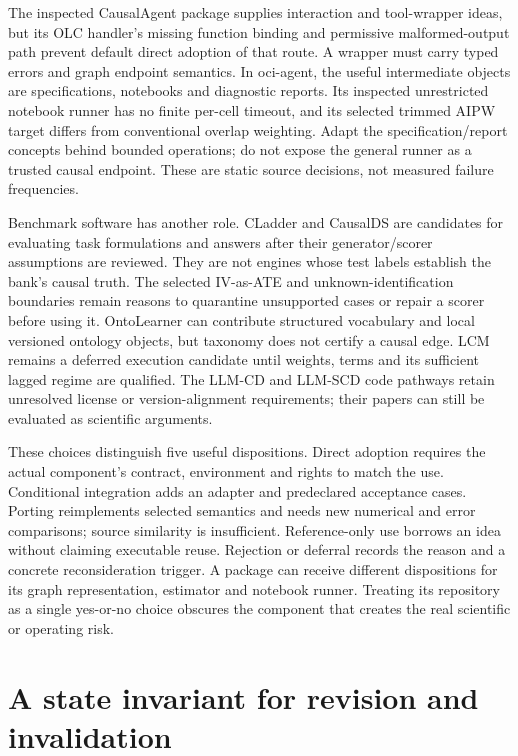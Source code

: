 The inspected CausalAgent package supplies interaction and tool-wrapper
ideas, but its OLC handler's missing function binding and permissive
malformed-output path prevent default direct adoption of that route. A
wrapper must carry typed errors and graph endpoint semantics. In oci-agent,
the useful intermediate objects are specifications, notebooks and diagnostic
reports. Its inspected unrestricted notebook runner has no finite per-cell
timeout, and its selected trimmed AIPW target differs from conventional
overlap weighting. Adapt the specification/report concepts behind bounded
operations; do not expose the general runner as a trusted causal endpoint.
These are static source decisions, not measured failure frequencies.
\citep{v12_la_package_causalagent,v12_la_package_oci_agent}

Benchmark software has another role. CLadder and CausalDS are candidates
for evaluating task formulations and answers after their generator/scorer
assumptions are reviewed. They are not engines whose test labels establish
the bank's causal truth. The selected IV-as-ATE and unknown-identification
boundaries remain reasons to quarantine unsupported cases or repair a
scorer before using it. OntoLearner can contribute structured vocabulary
and local versioned ontology objects, but taxonomy does not certify a
causal edge. LCM remains a deferred execution candidate until weights,
terms and its sufficient lagged regime are qualified. The LLM-CD and
LLM-SCD code pathways retain unresolved license or version-alignment
requirements; their papers can still be evaluated as scientific arguments.
\citep{v12_la_package_cladder,v12_la_package_causalds,v12_la_package_ontolearner,
v12_la_package_lcm,v12_la_package_llm_cd,v12_la_package_llm_scd}

These choices distinguish five useful dispositions. Direct adoption requires
the actual component's contract, environment and rights to match the use.
Conditional integration adds an adapter and predeclared acceptance cases.
Porting reimplements selected semantics and needs new numerical and error
comparisons; source similarity is insufficient. Reference-only use borrows
an idea without claiming executable reuse. Rejection or deferral records
the reason and a concrete reconsideration trigger. A package can receive
different dispositions for its graph representation, estimator and notebook
runner. Treating its repository as a single yes-or-no choice obscures the
component that creates the real scientific or operating risk.

\section{A state invariant for revision and invalidation}

